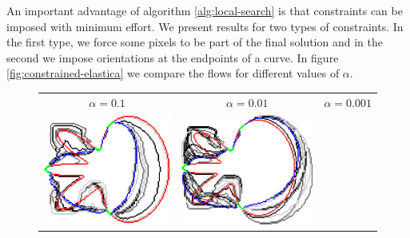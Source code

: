 An important advantage of algorithm \ref{alg:local-search} is that constraints can be imposed with minimum effort. We present results for two types of constraints. In the first type, we force some pixels to be part of the final solution and in the second we impose orientations at the endpoints of a curve. In figure \ref{fig:constrained-elastica} we compare the flows for different values of $\alpha$.


\begin{figure}
\center
\begin{tabular}{ccc}
$\alpha=0.1$ & $\alpha=0.01$ & $\alpha=0.001$\\[2em]
\includegraphics[scale=0.25]{figures/chapter5/fixed-pixels/elastica/len_pen_0.1/flower-1/summary.pdf} &
\includegraphics[scale=0.25]{figures/chapter5/fixed-pixels/elastica/len_pen_0.01/flower-1/summary.pdf} &

\end{tabular}
\end{figure}
